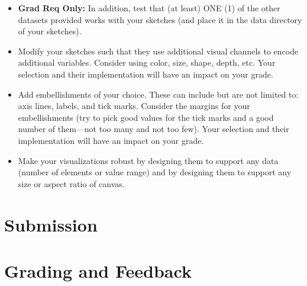 \documentclass[a4paper,12pt]{article}
\begin{document}
\begin{itemize}
\item \textbf{Grad Req Only:} In addition, test that (at least) ONE (1) of the other datasets provided works with your sketches (and place it in the data directory of your sketches).

\item Modify your sketches such that they use additional visual channels to encode additional variables. Consider using color, size, shape, depth, etc. Your selection and their implementation will have an impact on your grade.

\item Add embellishments of your choice. These can include but are not limited to: axis lines, labels, and tick marks. Consider the margins for your embellishments (try to pick good values for the tick marks and a good number of them---not too many and not too few). Your selection and their implementation will have an impact on your grade.

\item Make your visualizations robust by designing them to support any data (number of elements or value range) and by designing them to support any size or aspect ratio of canvas.

\end{itemize}


\section{Submission}


\section{Grading and Feedback}
\end{document}
